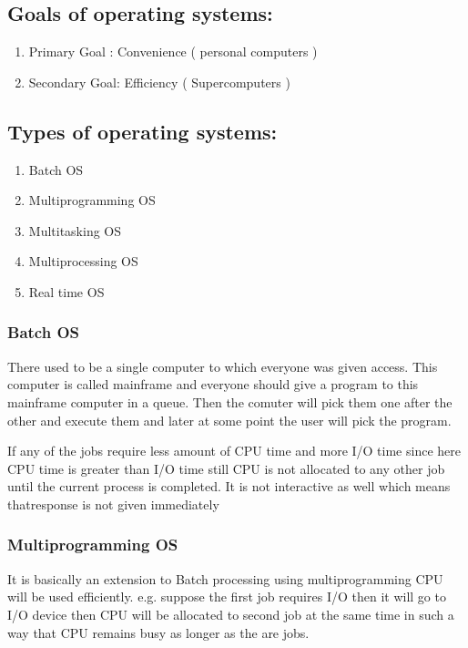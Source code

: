 \documentclass[12pt,letterpaper]{article}
\begin{document}
\subsection{Goals of operating systems: }
\begin{enumerate}
  \item Primary Goal : Convenience ( personal computers )
  \item Secondary Goal: Efficiency ( Supercomputers )
\end{enumerate}

\subsection{Types of operating systems:}
\begin{enumerate}
  \item Batch OS 
  \item Multiprogramming OS
  \item Multitasking OS
  \item Multiprocessing OS
  \item Real time OS
\end{enumerate}

\subsubsection{Batch OS}
There used to be a single computer to which everyone was given access. This computer is called mainframe and everyone should give a program to this mainframe computer in a queue.
Then the comuter will pick them one after the other and execute them and later at some point the user will pick the program.

If any of the jobs require less amount of CPU time  and more I/O time since here CPU time is greater than I/O time still CPU is not allocated to any other job until the current process is completed.
It is not interactive as well which means thatresponse is not given immediately

\subsubsection{Multiprogramming OS}
It is basically an extension to Batch processing using multiprogramming CPU will be used efficiently. e.g. suppose the first job requires I/O then it will go to I/O device then CPU will be allocated to second job at the same time in such a way that CPU remains busy as longer as the are jobs. 
\end{document}
